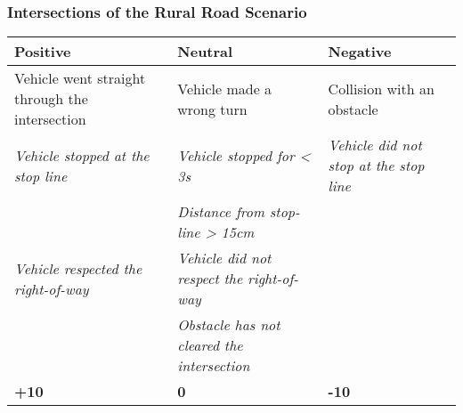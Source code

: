 {	\subsubsection*{Intersections of the Rural Road Scenario}
	\begin{table}[H]
		\begin{tabularx}{\textwidth}{XXX}
			\toprule
			\textbf{Positive}                                           & \textbf{Neutral}                                                   & \textbf{Negative}                                              \\
			\midrule
			Vehicle went straight through the intersection              & Vehicle made a wrong turn                                          & Collision with an obstacle                                     \\
			\textit{Vehicle stopped at the stop line}\footnotemark[1]   & \textit{Vehicle stopped for < 3s}\footnotemark[1]                  & \textit{Vehicle did not stop at the stop line}\footnotemark[1] \\
			                                                            & \textit{Distance from stop-line > 15cm}\footnotemark[1]            &                                                                \\
			\textit{Vehicle respected the right-of-way}\footnotemark[2] & \textit{Vehicle did not respect the right-of-way}\footnotemark[2]  &                                                                \\
			                                                            & \textit{Obstacle has not cleared the intersection}\footnotemark[2] &                                                                \\
			\topstrut
			\textbf{+10}                                                & \textbf{0}                                                         & \textbf{-10}                                                   \\
			\bottomrule
		\end{tabularx}
	\end{table}


}
